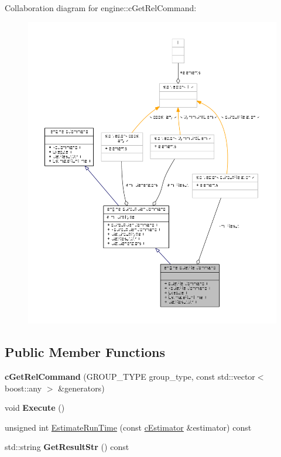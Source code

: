 Collaboration diagram for engine\-:\-:c\-Get\-Rel\-Command\-:
\nopagebreak
\begin{figure}[H]
\begin{center}
\leavevmode
\includegraphics[width=350pt]{classengine_1_1cGetRelCommand__coll__graph}
\end{center}
\end{figure}
\subsection*{Public Member Functions}
\begin{DoxyCompactItemize}
\item 
\hypertarget{classengine_1_1cGetRelCommand_aa6962470ec3861855bab696e13cf8a63}{{\bfseries c\-Get\-Rel\-Command} (G\-R\-O\-U\-P\-\_\-\-T\-Y\-P\-E group\-\_\-type, const std\-::vector$<$ boost\-::any $>$ \&generators)}\label{classengine_1_1cGetRelCommand_aa6962470ec3861855bab696e13cf8a63}

\item 
\hypertarget{classengine_1_1cGetRelCommand_a77179357376646c2c4885652cd80b4d2}{void {\bfseries Execute} ()}\label{classengine_1_1cGetRelCommand_a77179357376646c2c4885652cd80b4d2}

\item 
unsigned int \hyperlink{classengine_1_1cGetRelCommand_ad6aa9cb526ae1b73237edaad02d081ec}{Estimate\-Run\-Time} (const \hyperlink{classengine_1_1cEstimator}{c\-Estimator} \&estimator) const 
\item 
\hypertarget{classengine_1_1cGetRelCommand_ad6100147b7da79e6191e1097fe441b5a}{std\-::string {\bfseries Get\-Result\-Str} () const }\label{classengine_1_1cGetRelCommand_ad6100147b7da79e6191e1097fe441b5a}

\end{DoxyCompactItemize}
